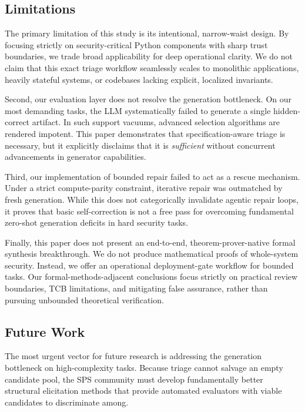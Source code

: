 \documentclass[11pt]{article}
\begin{document}
\subsection{Limitations}

The primary limitation of this study is its intentional, narrow-waist design. By focusing strictly on security-critical Python components with sharp trust boundaries, we trade broad applicability for deep operational clarity. We do not claim that this exact triage workflow seamlessly scales to monolithic applications, heavily stateful systems, or codebases lacking explicit, localized invariants. 

Second, our evaluation layer does not resolve the generation bottleneck. On our most demanding tasks, the LLM systematically failed to generate a single hidden-correct artifact. In such support vacuums, advanced selection algorithms are rendered impotent. This paper demonstrates that specification-aware triage is necessary, but it explicitly disclaims that it is \emph{sufficient} without concurrent advancements in generator capabilities.

Third, our implementation of bounded repair failed to act as a rescue mechanism. Under a strict compute-parity constraint, iterative repair was outmatched by fresh generation. While this does not categorically invalidate agentic repair loops, it proves that basic self-correction is not a free pass for overcoming fundamental zero-shot generation deficits in hard security tasks.

Finally, this paper does not present an end-to-end, theorem-prover-native formal synthesis breakthrough. We do not produce mathematical proofs of whole-system security. Instead, we offer an operational deployment-gate workflow for bounded tasks. Our formal-methods-adjacent conclusions focus strictly on practical review boundaries, TCB limitations, and mitigating false assurance, rather than pursuing unbounded theoretical verification.

\subsection{Future Work}

The most urgent vector for future research is addressing the generation bottleneck on high-complexity tasks. Because triage cannot salvage an empty candidate pool, the SPS community must develop fundamentally better structural elicitation methods that provide automated evaluators with viable candidates to discriminate among.
\end{document}

